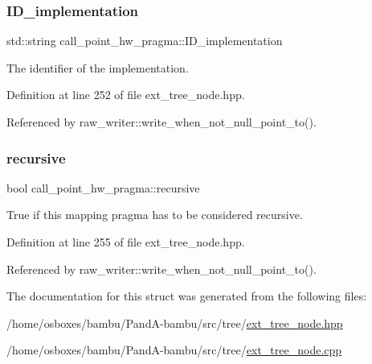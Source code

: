 \mbox{\label{structcall__point__hw__pragma_a1fe31464f943533938e61477478511ef}} 
\subsubsection{\texorpdfstring{I\+D\+\_\+implementation}{ID\_implementation}}
{\footnotesize\ttfamily std\+::string call\+\_\+point\+\_\+hw\+\_\+pragma\+::\+I\+D\+\_\+implementation}



The identifier of the implementation. 



Definition at line 252 of file ext\+\_\+tree\+\_\+node.\+hpp.



Referenced by raw\+\_\+writer\+::write\+\_\+when\+\_\+not\+\_\+null\+\_\+point\+\_\+to().

\mbox{\label{structcall__point__hw__pragma_ac96181a1ad7d294b231b7bfddc82f025}} 
\subsubsection{\texorpdfstring{recursive}{recursive}}
{\footnotesize\ttfamily bool call\+\_\+point\+\_\+hw\+\_\+pragma\+::recursive}



True if this mapping pragma has to be considered recursive. 



Definition at line 255 of file ext\+\_\+tree\+\_\+node.\+hpp.



Referenced by raw\+\_\+writer\+::write\+\_\+when\+\_\+not\+\_\+null\+\_\+point\+\_\+to().



The documentation for this struct was generated from the following files\+:\begin{DoxyCompactItemize}
\item 
/home/osboxes/bambu/\+Pand\+A-\/bambu/src/tree/\hyperlink{ext__tree__node_8hpp}{ext\+\_\+tree\+\_\+node.\+hpp}\item 
/home/osboxes/bambu/\+Pand\+A-\/bambu/src/tree/\hyperlink{ext__tree__node_8cpp}{ext\+\_\+tree\+\_\+node.\+cpp}\end{DoxyCompactItemize}
